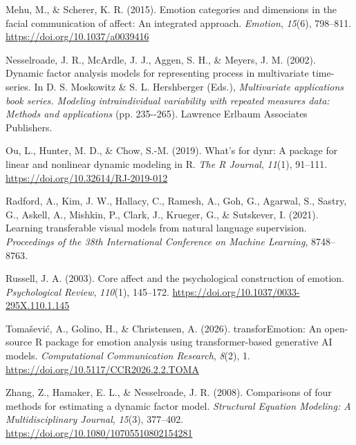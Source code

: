 \documentclass[
]{article}
\newlength{\cslhangindent}
\newenvironment{CSLReferences}[2] %
 {\begin{list}{}{%
  \setlength{\itemindent}{0pt}
  \setlength{\leftmargin}{0pt}
  \setlength{\parsep}{0pt}
  \ifodd #1
   \setlength{\leftmargin}{\cslhangindent}
   \setlength{\itemindent}{-1\cslhangindent}
  \fi
  \setlength{\itemsep}{#2\baselineskip}}}
 {\end{list}}
\begin{document}
\begin{CSLReferences}{1}{0}
Mehu, M., \& Scherer, K. R. (2015). Emotion categories and dimensions in
the facial communication of affect: {An} integrated approach.
\emph{Emotion}, \emph{15}(6), 798--811.
\url{https://doi.org/10.1037/a0039416}

Nesselroade, J. R., McArdle, J. J., Aggen, S. H., \& Meyers, J. M.
(2002). Dynamic factor analysis models for representing process in
multivariate time-series. In D. S. Moskowitz \& S. L. Hershberger
(Eds.), \emph{Multivariate applications book series. Modeling
intraindividual variability with repeated measures data: Methods and
applications} (pp. 235-\/-265). Lawrence Erlbaum Associates Publishers.

Ou, L., Hunter, M. D., \& Chow, S.-M. (2019). What's for {dynr}: A
package for linear and nonlinear dynamic modeling in {R}. \emph{The R
Journal}, \emph{11}(1), 91--111.
\url{https://doi.org/10.32614/RJ-2019-012}

Radford, A., Kim, J. W., Hallacy, C., Ramesh, A., Goh, G., Agarwal, S.,
Sastry, G., Askell, A., Mishkin, P., Clark, J., Krueger, G., \&
Sutskever, I. (2021). Learning transferable visual models from natural
language supervision. \emph{Proceedings of the 38th International
Conference on Machine Learning}, 8748--8763.

Russell, J. A. (2003). Core affect and the psychological construction of
emotion. \emph{Psychological Review}, \emph{110}(1), 145--172.
\url{https://doi.org/10.1037/0033-295X.110.1.145}

Tomašević, A., Golino, H., \& Christensen, A. (2026). {transforEmotion}:
An open-source {R} package for emotion analysis using transformer-based
generative {AI} models. \emph{Computational Communication Research},
\emph{8}(2), 1. \url{https://doi.org/10.5117/CCR2026.2.2.TOMA}

Zhang, Z., Hamaker, E. L., \& Nesselroade, J. R. (2008). Comparisons of
four methods for estimating a dynamic factor model. \emph{Structural
Equation Modeling: A Multidisciplinary Journal}, \emph{15}(3), 377--402.
\url{https://doi.org/10.1080/10705510802154281}

\end{CSLReferences}

\endgroup
\end{document}

